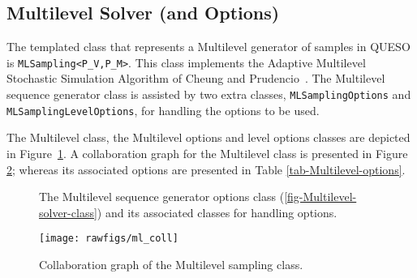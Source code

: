 \subsection{Multilevel Solver (and Options)}\label{sec:ML}


The templated class that represents a Multilevel generator of samples in QUESO is \linebreak \verb+MLSampling<P_V,P_M>+. This class implements the Adaptive Multilevel Stochastic Simulation Algorithm of Cheung and Prudencio~\cite{CheungPrudencio2012}.
The Multilevel sequence generator class is assisted by two extra classes, \verb+MLSamplingOptions+ and \verb+MLSamplingLevelOptions+, for handling the options to be used.

The Multilevel class, the Multilevel options and level options classes are depicted in Figure~\ref{fig-Multilevel-options-class}.  A collaboration graph for the Multilevel class is presented in Figure \ref{fig-Multilevel-coll}; whereas its associated options are presented in Table \ref{tab-Multilevel-options}.
%

\begin{figure}[htpb]
\centering
{}\hspace{-1.5cm}
\hspace{-1.5cm}
 \vspace{-.2cm}
\caption{The Multilevel sequence generator options class (\ref{fig-Multilevel-solver-class}) and its associated classes for handling options.}
\label{fig-Multilevel-options-class}
\end{figure}


\begin{figure}[p]
\centering
\texttt{[image: rawfigs/ml\_coll]}
 \vspace{-.8cm}
\caption{Collaboration graph of the  Multilevel sampling class.}
\label{fig-Multilevel-coll}
\end{figure}


